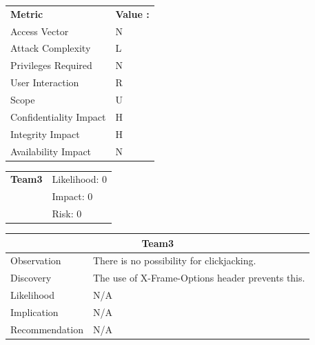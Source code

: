 \documentclass[headsepline,footsepline,footinclude=false,oneside,fontsize=11pt,paper=a4,listof=totoc,bibliography=totoc]{scrbook} %
\begin{document}
\begin{center}
	\begin{tabular}{ll}
		\rowcolor[HTML]{34CDF9}
		{\color[HTML]{ECF4FF} \textbf{Metric}}        & {\color[HTML]{ECF4FF} \textbf{Value : }} \\
		\rowcolor[HTML]{BBDAFF}
		{\color[HTML]{333333} Access Vector}          & {\color[HTML]{333333} } N              \\
		\rowcolor[HTML]{ECF4FF}
		{\color[HTML]{333333} Attack Complexity}      & {\color[HTML]{333333} } L              \\
		\rowcolor[HTML]{BBDAFF}
		{\color[HTML]{333333} Privileges Required}    & {\color[HTML]{333333} } N              \\
		\rowcolor[HTML]{ECF4FF}
		{\color[HTML]{333333} User Interaction}       & {\color[HTML]{333333} } R              \\
		\rowcolor[HTML]{BBDAFF}
		{\color[HTML]{333333} Scope}                  & {\color[HTML]{333333} } U              \\
		\rowcolor[HTML]{ECF4FF}
		{\color[HTML]{333333} Confidentiality Impact} & {\color[HTML]{333333} } H              \\
		\rowcolor[HTML]{BBDAFF}
		{\color[HTML]{333333} Integrity Impact}       & {\color[HTML]{333333} } H              \\
		\rowcolor[HTML]{ECF4FF}
		{\color[HTML]{333333} Availability Impact}    & {\color[HTML]{333333} } N
	\end{tabular}
\end{center} 
\vspace{0.5cm}

\begin{tabular}{cR{12cm}}
	\textbf{Team3} & Likelihood: 0\\& Impact: 0\\& Risk: 0
\end{tabular}

\begin{tabular}{ l|p{11cm}  }
	\hline
	\multicolumn{2}{c}{\textbf{Team3}} \\
	\hline
	Observation   & There is no possibility for clickjacking.  \\
	Discovery  &The use of X-Frame-Options header prevents this. \\
	Likelihood &  N/A \\
	Implication    & N/A \\
	Recommendation & N/A \\
	\hline
\end{tabular}

\appendix{}

\glsaddall{} %
\printglossaries{}

\printbibliography{}
\end{document}
